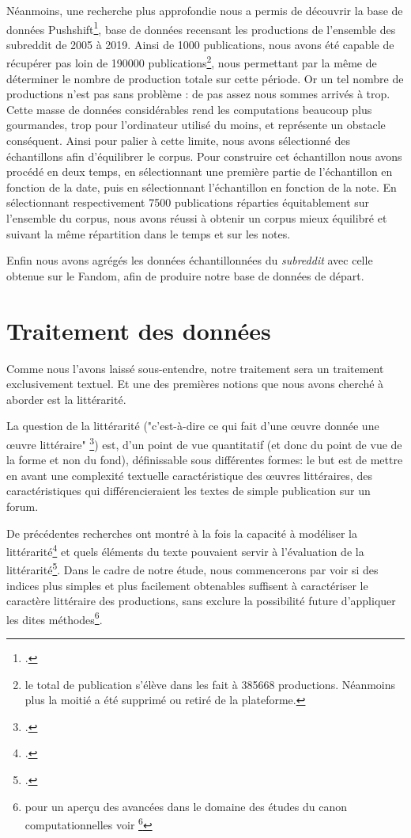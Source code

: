 \documentclass[12pt,a4paper,oneside,titlepage]{book} %
\begin{document}
	Néanmoins, une recherche plus approfondie nous a permis de découvrir la base de données Pushshift\footcite{baumgartner_pushshift_2020}, base de données recensant les productions de l'ensemble des subreddit de 2005 à 2019. Ainsi de 1000 publications, nous avons été capable de récupérer pas loin de 190000 publications\footnote{le total de publication s'élève dans les fait à 385668 productions. Néanmoins plus la moitié a été supprimé ou retiré de la plateforme.}, nous permettant par la même de déterminer le nombre de production totale sur cette période. 
	Or un tel nombre de productions n'est pas sans problème : de pas assez nous sommes arrivés à trop. Cette masse de données considérables rend les computations beaucoup plus gourmandes, trop pour l'ordinateur utilisé du moins, et représente un obstacle conséquent. Ainsi pour palier à cette limite, nous avons sélectionné des échantillons afin d'équilibrer le corpus. Pour construire cet échantillon nous avons procédé en deux temps, en sélectionnant une première partie de l'échantillon en fonction de la date, puis en sélectionnant l'échantillon en fonction de la note. En sélectionnant respectivement 7500 publications réparties équitablement sur l'ensemble du corpus, nous avons réussi à obtenir un corpus mieux équilibré et suivant la même répartition dans le temps et sur les notes. 
	
	Enfin nous avons agrégés les données échantillonnées du \textit{subreddit} avec celle obtenue sur le Fandom, afin de produire notre base de données de départ.
	
	
	
	\chapter{Traitement des données}
	Comme nous l'avons laissé sous-entendre, notre traitement sera un traitement exclusivement textuel. Et une des premières notions que nous avons cherché à aborder est la littérarité.
	
		La question de la littérarité ("c'est-à-dire ce qui fait d'une œuvre donnée une œuvre littéraire" \footcite{aron_litterature_1984}) est, d'un point de vue quantitatif (et donc du point de vue de la forme et non du fond), définissable sous différentes formes: le but est de mettre en avant une complexité textuelle caractéristique des œuvres littéraires, des caractéristiques qui différencieraient les textes de simple publication sur un forum.
		
		De précédentes recherches ont montré à la fois la capacité à modéliser la littérarité\footcite{koolen_literary_2020} et quels éléments du texte pouvaient servir à l'évaluation de la littérarité\footcite{van_cranenburgh_identifying_2015}. Dans le cadre de notre étude, nous commencerons par voir si des indices plus simples et plus facilement obtenables suffisent à caractériser le caractère littéraire des productions, sans exclure la possibilité future d'appliquer les dites méthodes\footnote{pour un aperçu des avancées dans le domaine des études du canon computationnelles voir \footcite{barre_operationalizing_2023}}.
		
\end{document}
